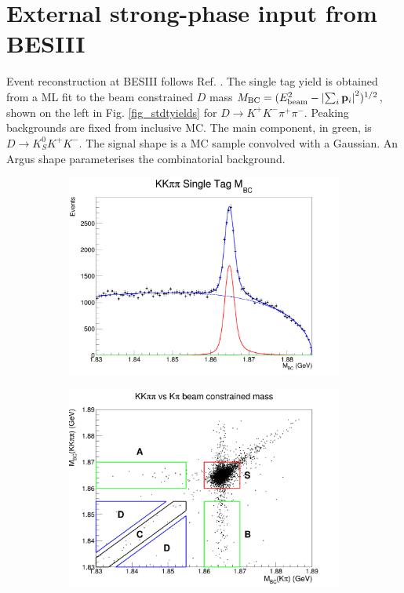 \documentclass[12pt, a4paper, notitlepage, onecolumn]{article}
\begin{document}
\section{External strong-phase input from BESIII}
\noindent Event reconstruction at BESIII follows Ref. \cite{cite_KSKKAnalysis}. The single tag yield is obtained from a ML fit to the beam constrained $D$ mass $M_\text{BC} = (E_\text{beam}^2 - \abs{\sum_i\vb{p}_i}^2)^{1/2}$, shown on the left in Fig. \ref{fig_stdtyields} for $D\to K^+K^-\pi^+\pi^-$. Peaking backgrounds are fixed from inclusive MC. The main component, in green, is $D\to K_S^0K^+K^-$. The signal shape is a MC sample convolved with a Gaussian. An Argus shape parameterises the combinatorial background.

\begin{figure}[H] 
  \centering
  \begin{subfigure}{0.5\textwidth}
    \centering
    \includegraphics[width=1\textwidth]{Plots/KKpipiSingleTagMBCPlot.png}
  \end{subfigure}%
  \begin{subfigure}{0.5\textwidth}
    \centering
    \includegraphics[width=1\textwidth]{Plots/KpiDoubleTagYield.png}

\end{subfigure}
\end{figure}
\end{document}
